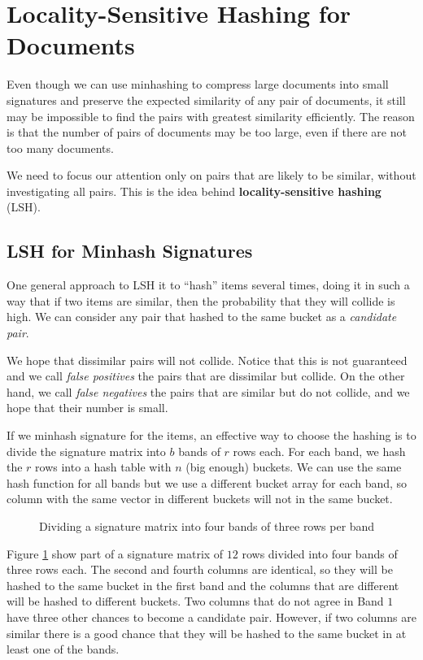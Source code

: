 \section{Locality-Sensitive Hashing for Documents}\label{sec:lsh-documents}

Even though we can use minhashing to compress large documents into small signatures and preserve the expected similarity of any pair of documents, it still may be impossible to find the pairs with greatest similarity efficiently. The reason is that the number of pairs of documents may be too large, even if there are not too many documents. 

We need to focus our attention only on pairs that are likely to be similar, without investigating all pairs. This is the idea behind \textbf{locality-sensitive hashing} (LSH).

\subsection{LSH for Minhash Signatures}\label{sec:lsh-minhash}

One general approach to LSH it to ``hash'' items several times, doing it in such a way that if two items are similar, then the probability that they will collide is high. We can consider any pair that hashed to the same bucket as a \textit{candidate pair}.

We hope that dissimilar pairs will not collide. Notice that this is not guaranteed and we call \textit{false positives} the pairs that are dissimilar but collide. On the other hand, we call \textit{false negatives} the pairs that are similar but do not collide, and we hope that their number is small.

If we minhash signature for the items, an effective way to choose the hashing is to divide the signature matrix into $b$ bands of $r$ rows each. For each band, we hash the $r$ rows into a hash table with $n$ (big enough) buckets. We can use the same hash function for all bands but we use a different bucket array for each band, so column with the same vector in different buckets will not in the same bucket.


\begin{figure}[H]
\centering
\scalebox{1}{
    
}
\caption{Dividing a signature matrix into four bands of three rows per band}
\label{fig:4-signature-matrix-4-bands}
\end{figure}

Figure \ref{fig:4-signature-matrix-4-bands} show part of a signature matrix of $12$ rows divided into four bands of three rows each. The second and fourth columns are identical, so they will be hashed to the same bucket in the first band and the columns that are different will be hashed to different buckets. Two columns that do not agree in Band $1$ have three other chances to become a candidate pair. However, if two columns are similar there is a good chance that they will be hashed to the same bucket in at least one of the bands.

